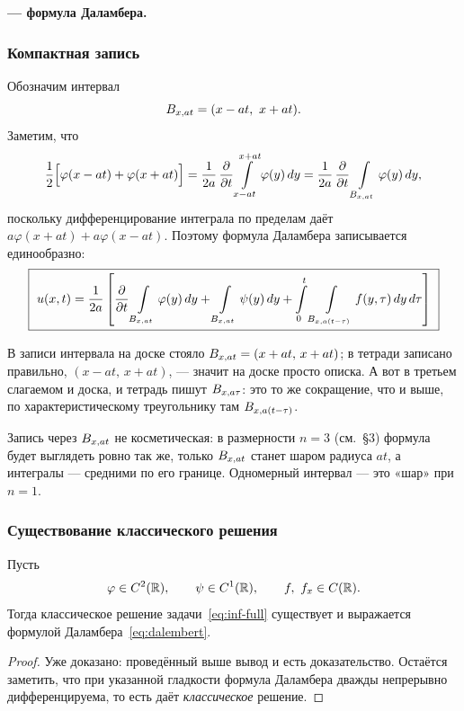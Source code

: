 \begin{center}
\textbf{— формула Даламбера.}
\end{center}

\subsubsection*{Компактная запись}

Обозначим интервал
\[
  B_{x,at} = (x - at,\ x + at).
\]
Заметим, что
\[
  \frac12\Big[\varphi(x-at) + \varphi(x+at)\Big]
  = \frac{1}{2a}\,\frac{\partial }{\partial t} \int\limits_{x-at}^{x+at} \varphi(y)\, dy
  = \frac{1}{2a}\,\frac{\partial }{\partial t} \int\limits_{B_{x,at}} \varphi(y)\, dy ,
\]
поскольку дифференцирование интеграла по пределам даёт
$a\varphi(x+at) + a\varphi(x-at)$. Поэтому формула Даламбера записывается
единообразно:
\[
  \boxed{\ u(x,t) = \frac{1}{2a}\left[
    \frac{\partial }{\partial t} \int\limits_{B_{x,at}} \varphi(y)\, dy
    + \int\limits_{B_{x,at}} \psi(y)\, dy
    + \int\limits_0^t \int\limits_{B_{x,a(t-\tau)}} f(y,\tau)\, dy\, d\tau
  \right]\ }
\]

\begin{warn}
В записи интервала на доске стояло $B_{x,at} = (x+at,\, x+at)$; в тетради
записано правильно, $(x-at,\, x+at)$, — значит на доске просто описка.
А вот в третьем слагаемом и доска, и тетрадь пишут $B_{x,a\tau}$: это то же
сокращение, что и выше, по характеристическому треугольнику там
$B_{x,a(t-\tau)}$.
\end{warn}

\begin{idea}
Запись через $B_{x,at}$ не косметическая: в размерности $n = 3$ (см.~\S3)
формула будет выглядеть ровно так же, только $B_{x,at}$ станет шаром радиуса
$at$, а интегралы — средними по его границе. Одномерный интервал — это «шар» при
$n=1$.
\end{idea}

\subsubsection*{Существование классического решения}

\begin{theorem}\label{thm:dalembert-exist}
Пусть
\[
  \varphi \in C^2(\mathbb{R}), \qquad \psi \in C^1(\mathbb{R}), \qquad f,\ f_x \in C(\mathbb{R}) .
\]
Тогда классическое решение задачи~\eqref{eq:inf-full} существует и выражается
формулой Даламбера~\eqref{eq:dalembert}.
\end{theorem}

\begin{proof}
Уже доказано: проведённый выше вывод и есть доказательство. Остаётся заметить,
что при указанной гладкости формула Даламбера дважды непрерывно
дифференцируема, то есть даёт \emph{классическое} решение.
\end{proof}

